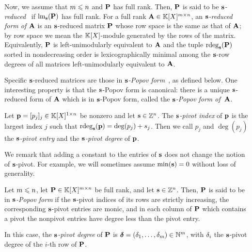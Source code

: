 \documentclass[preprint]{sig-alternate-05-2015}
\begin{document}
Now, we assume that $\rdim \le \cdim$ and $\mat{P}$ has full rank. Then,
$\mat{P}$ is said to be \emph{$\shifts$-reduced}~\cite{Kailath80,BeLaVi06} if
$\leadingMat[\shifts]{\mat{P}}$ has full rank. For a full rank $\mat{A} \in
\polMatSpace[\rdim][\cdim]$, an \emph{$\shifts$-reduced form of $\mat{A}$} is
an $\shifts$-reduced matrix $\mat{P}$ whose row space is the same as that of
$\mat{A}$; by row space we mean the $\polRing$-module generated by the rows of
the matrix. Equivalently, $\mat{P}$ is left-unimodularly equivalent to
$\mat{A}$ and the tuple $\rdeg[\shifts]{\mat{P}}$ sorted in nondecreasing order
is lexicographically minimal among the $\shifts$-row degrees of all matrices
left-unimodularly equivalent to $\mat{A}$.

Specific $\shifts$-reduced matrices are those in \emph{$\shifts$-Popov
form}~\cite{Kailath80,BecLab00,BeLaVi06}, as defined below. One interesting
property is that the $\shifts$-Popov form is canonical: there is a unique
$\shifts$-reduced form of $\mat{A}$ which is in $\shifts$-Popov form, called
the \emph{$\shifts$-Popov form of~$\mat{A}$}.

\vspace{-0.1cm}
\begin{dfn}[Pivot]
\label{dfn:pivot}
Let $\row{p} = [p_j]_j \in \polMatSpace[1][\cdim]$ be nonzero and let $\shifts
\in \shiftSpace[\cdim]$. The \emph{$\shifts$-pivot index} of $\row{p}$ is the
largest index $j$ such that $\rdeg[\shifts]{\row{p}} = \deg(p_j) + \shift{j}$.
Then we call $p_j$ and $\deg(p_j)$ the \emph{$\shifts$-pivot entry} and the
\emph{$\shifts$-pivot degree} of $\row{p}$.
\end{dfn}
\vspace{-0.05cm}

We remark that adding a constant to the entries of $\shifts$ does not change
the notion of $\shifts$-pivot. For example, we will sometimes assume
$\min(\shifts)=0$ without loss of generality.

\vspace{-0.05cm}
\begin{dfn}
\label{dfn:popov}
Let $\rdim \le \cdim$, let $\mat{P} \in \polMatSpace[\rdim][\cdim]$ be
full rank, and let $\shifts \in \shiftSpace[\cdim]$. Then, $\mat{P}$ is said to
be in \emph{$\shifts$-Popov form} if the $\shifts$-pivot indices of its rows
are strictly increasing, the corresponding $\shifts$-pivot entries are monic,
and in each column of $\mat{P}$ which contains a pivot the nonpivot entries
have degree less than the pivot entry.

In this case, the \emph{$\shifts$-pivot degree} of $\mat{P}$ is $\minDegs =
(\minDeg_1,\ldots,\minDeg_\rdim) \in \NN^\rdim$, with $\minDeg_i$ the
$\shifts$-pivot degree of the $i$-th row of $\mat{P}$.
\end{dfn}
\end{document}
